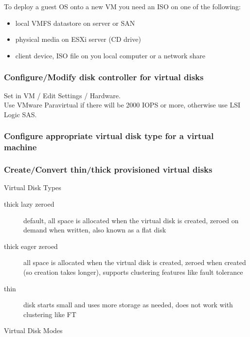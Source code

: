 To deploy a guest OS onto a new VM you need an ISO on one of the following:

\begin{itemize}
\item local VMFS datastore on server or SAN
\item physical media on ESXi server (CD drive)
\item client device, ISO file on you local computer or a network share
\end{itemize}

\subsubsection{Configure/Modify disk controller for virtual disks}

Set in VM / Edit Settings / Hardware.\\

Use VMware Paravirtual if there will be 2000 IOPS or more, otherwise use
LSI Logic SAS.

\subsubsection{Configure appropriate virtual disk type for a virtual machine}

\subsubsection{Create/Convert thin/thick provisioned virtual disks}

Virtual Disk Types

\begin{description}

\item[thick lazy zeroed]
default, all space is allocated when the virtual disk is created, zeroed on
demand when written, also known as a flat disk

\item[thick eager zeroed]
all space is allocated when the virtual disk is created, zeroed when created
(so creation takes longer), supports clustering features like fault tolerance

\item[thin]
disk starts small and uses more storage as needed, does not work with
clustering like FT

\end{description}

Virtual Disk Modes

